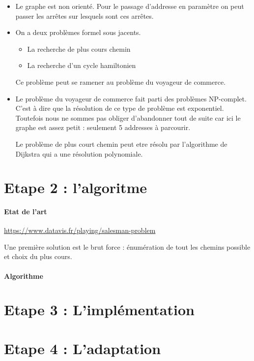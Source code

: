\documentclass[11pt,a4paper]{article}
\begin{document}
\begin{itemize}
\begin{itemize}
\begin{center}
        \end{center}
    \end{itemize}
        

        \item Le graphe est non orienté. Pour le passage d'addresse en paramètre on peut passer les arrêtes sur lesquels sont ces arrêtes.

        
    \item On a deux problèmes formel sous jacents.
    \begin{itemize}
        \item La recherche de plus cours chemin
        \item La recherche d'un cycle hamiltonien
    \end{itemize}
    Ce problème peut se ramener au problème du voyageur de commerce.
    \item Le problème du voyageur de commerce fait parti des problèmes NP-complet. C'est à dire que la résolution de ce type de problème est exponentiel.
    Toutefois nous ne sommes pas obliger d'abandonner tout de suite car ici le graphe est assez petit : seulement 5 addresses à parcourir.

    Le problème de plus court chemin peut etre résolu par l'algorithme de Dijkstra qui a une résolution polynomiale.
\end{itemize}
\section{Etape 2 : l'algoritme}
\paragraph{Etat de l'art}
\url{https://www.datavis.fr/playing/salesman-problem}

Une première solution est le brut force : énumération de tout les chemins possible et choix du plus cours. 
\paragraph{Algorithme}

\section{Etape 3 : L'implémentation}
\section{Etape 4 : L'adaptation}
\end{document}
